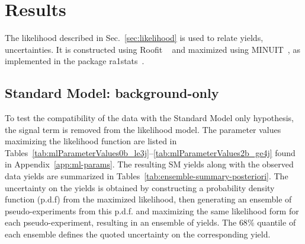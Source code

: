 \clearpage
\section{Results\label{sec:results}}

The likelihood described in Sec.~\ref{sec:likelihood} is used to
relate yields, uncertainties. It is constructed using Roofit
~\cite{roofit} and maximized using MINUIT~\cite{James:1975dr}, as
implemented in the package ra1stats~\cite{ra1stats}.

\subsection{Standard Model: background-only\label{sec:smInterp}}

To test the compatibility of the data with the Standard Model only hypothesis,
the signal term is removed from the likelihood model. The parameter values 
maximizing the likelihood function are listed in 
Tables~\ref{tab:mlParameterValues0b_le3j}--\ref{tab:mlParameterValues2b_ge4j}
found in Appendix~\ref{app:ml-params}. The resulting SM yields
along with the observed data yields are summarized in Tables~\ref{tab:ensemble-summary-posteriori}.
The uncertainty on the yields is obtained by constructing a probability density
function (p.d.f) from the maximized likelihood, then generating an
ensemble of pseudo-experiments from this p.d.f. and maximizing the same 
likelihood form for each pseudo-experiment, resulting in an ensemble of yields.
The $68\%$ quantile of each ensemble defines the quoted uncertainty on the 
corresponding yield.

